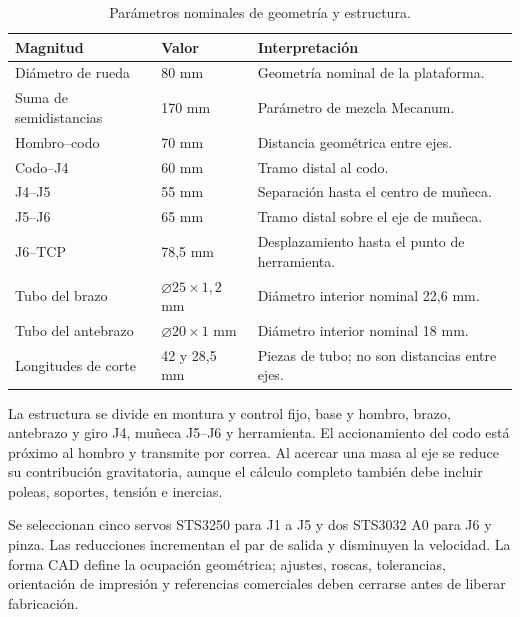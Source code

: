 \begin{table}[!htbp]
\centering\small
\caption{Parámetros nominales de geometría y estructura.}
\begin{tabularx}{\linewidth}{@{}P{51mm}P{27mm}Y@{}}
\toprule\textbf{Magnitud} & \textbf{Valor} & \textbf{Interpretación}\\\midrule
Diámetro de rueda & 80 mm & Geometría nominal de la plataforma.\\
Suma de semidistancias & 170 mm & Parámetro de mezcla Mecanum.\\
Hombro--codo & 70 mm & Distancia geométrica entre ejes.\\
Codo--J4 & 60 mm & Tramo distal al codo.\\
J4--J5 & 55 mm & Separación hasta el centro de muñeca.\\
J5--J6 & 65 mm & Tramo distal sobre el eje de muñeca.\\
J6--TCP & 78,5 mm & Desplazamiento hasta el punto de herramienta.\\
Tubo del brazo & $\varnothing 25\times1{,}2$ mm & Diámetro interior nominal 22,6 mm.\\
Tubo del antebrazo & $\varnothing 20\times1$ mm & Diámetro interior nominal 18 mm.\\
Longitudes de corte & 42 y 28,5 mm & Piezas de tubo; no son distancias entre ejes.\\
\bottomrule
\end{tabularx}
\end{table}

La estructura se divide en montura y control fijo, base y hombro, brazo, antebrazo y giro J4, muñeca J5--J6 y herramienta. El accionamiento del codo está próximo al hombro y transmite por correa. Al acercar una masa al eje se reduce su contribución gravitatoria, aunque el cálculo completo también debe incluir poleas, soportes, tensión e inercias.

Se seleccionan cinco servos STS3250 para J1 a J5 y dos STS3032 A0 para J6 y pinza. Las reducciones incrementan el par de salida y disminuyen la velocidad. La forma CAD define la ocupación geométrica; ajustes, roscas, tolerancias, orientación de impresión y referencias comerciales deben cerrarse antes de liberar fabricación.


